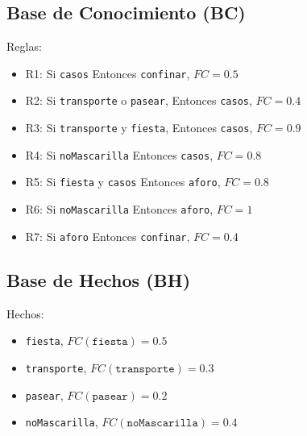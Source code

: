 \subsection{Base de Conocimiento (BC)}
Reglas:
\begin{itemize}
    \item R1: Si \texttt{casos} Entonces \texttt{confinar}, $FC=0.5$
    \item R2: Si \texttt{transporte} o \texttt{pasear}, Entonces \texttt{casos}, $FC=0.4$
    \item R3: Si \texttt{transporte} y \texttt{fiesta}, Entonces \texttt{casos}, $FC=0.9$
    \item R4: Si \texttt{noMascarilla} Entonces \texttt{casos}, $FC=0.8$
    \item R5: Si \texttt{fiesta} y \texttt{casos} Entonces \texttt{aforo}, $FC=0.8$
    \item R6: Si \texttt{noMascarilla} Entonces \texttt{aforo}, $FC=1$
    \item R7: Si \texttt{aforo} Entonces \texttt{confinar}, $FC=0.4$
\end{itemize}

\subsection{Base de Hechos (BH)}
Hechos:
\begin{itemize}
    \item \texttt{fiesta}, $FC(\texttt{fiesta}) = 0.5$
    \item \texttt{transporte}, $FC(\texttt{transporte}) = 0.3$
    \item \texttt{pasear}, $FC(\texttt{pasear}) = 0.2$
    \item \texttt{noMascarilla}, $FC(\texttt{noMascarilla}) = 0.4$
\end{itemize}
\newpage
